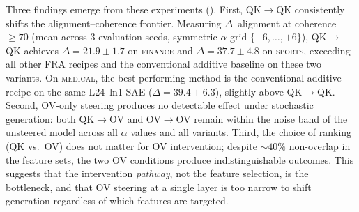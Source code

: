 \documentclass{article}
\theoremstyle{plain}
\theoremstyle{definition}
\theoremstyle{remark}
\begin{document}

Three findings emerge from these experiments (). First, QK$\to$QK consistently shifts the alignment--coherence frontier. Measuring $\Delta$~alignment at coherence $\geq 70$ (mean across 3 evaluation seeds, symmetric $\alpha$ grid $\{-6,\ldots,+6\}$), QK$\to$QK achieves $\Delta = 21.9 \pm 1.7$ on \textsc{finance} and $\Delta = 37.7 \pm 4.8$ on \textsc{sports}, exceeding all other FRA recipes and the conventional additive baseline on these two variants. On \textsc{medical}, the best-performing method is the conventional additive recipe on the same L24~ln1 SAE ($\Delta = 39.4 \pm 6.3$), slightly above QK$\to$QK. Second, OV-only steering produces no detectable effect under stochastic generation: both QK$\to$OV and OV$\to$OV remain within the noise band of the unsteered model across all $\alpha$ values and all variants. Third, the choice of ranking (QK vs.\ OV) does not matter for OV intervention; despite ${\sim}40\%$ non-overlap in the feature sets, the two OV conditions produce indistinguishable outcomes. This suggests that the intervention \emph{pathway}, not the feature selection, is the bottleneck, and that OV steering at a single layer is too narrow to shift generation regardless of which features are targeted.



\end{document}
